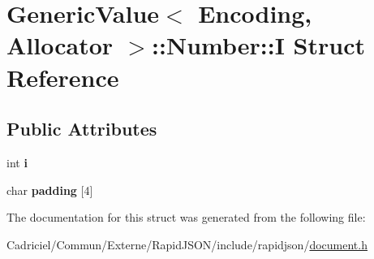 \hypertarget{struct_generic_value_1_1_number_1_1_i}{}\section{Generic\+Value$<$ Encoding, Allocator $>$\+:\+:Number\+:\+:I Struct Reference}
\label{struct_generic_value_1_1_number_1_1_i}
\subsection*{Public Attributes}
\begin{DoxyCompactItemize}
\item 
int {\bfseries i}\hypertarget{struct_generic_value_1_1_number_1_1_i_ae0b250dc448d284cf9019f3932bfc380}{}\label{struct_generic_value_1_1_number_1_1_i_ae0b250dc448d284cf9019f3932bfc380}

\item 
char {\bfseries padding} \mbox{[}4\mbox{]}\hypertarget{struct_generic_value_1_1_number_1_1_i_aefc064997f30c9c0b2bdce187d1d4cce}{}\label{struct_generic_value_1_1_number_1_1_i_aefc064997f30c9c0b2bdce187d1d4cce}

\end{DoxyCompactItemize}


The documentation for this struct was generated from the following file\+:\begin{DoxyCompactItemize}
\item 
Cadriciel/\+Commun/\+Externe/\+Rapid\+J\+S\+O\+N/include/rapidjson/\hyperlink{document_8h}{document.\+h}\end{DoxyCompactItemize}
